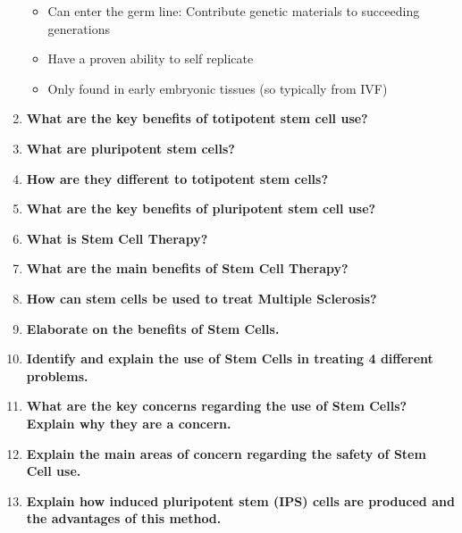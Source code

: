 \documentclass[a4paper]{article}
\begin{document}
\begin{enumerate}
\begin{itemize}
	\item Can enter the germ line: Contribute genetic materials to succeeding generations
	\item Have a proven ability to self replicate
	\item Only found in early embryonic tissues (so typically from IVF)
\end{itemize}


    \item \textbf{What are the key benefits of totipotent stem cell use?}


    \item \textbf{What are pluripotent stem cells?}


    \item \textbf{How are they different to totipotent stem cells?}


    \item \textbf{What are the key benefits of pluripotent stem cell use?}


    \item \textbf{What is Stem Cell Therapy?}


    \item \textbf{What are the main benefits of Stem Cell Therapy?}


    \item \textbf{How can stem cells be used to treat Multiple Sclerosis?}


    \item \textbf{Elaborate on the benefits of Stem Cells.}


    \item \textbf{Identify and explain the use of Stem Cells in treating 4 different problems.}


    \item \textbf{What are the key concerns regarding the use of Stem Cells? Explain why they are a concern.}


    \item \textbf{Explain the main areas of concern regarding the safety of Stem Cell use.}


    \item \textbf{Explain how induced pluripotent stem (IPS) cells are produced and the advantages of this method.}


\end{enumerate}

\medskip



\end{document}
